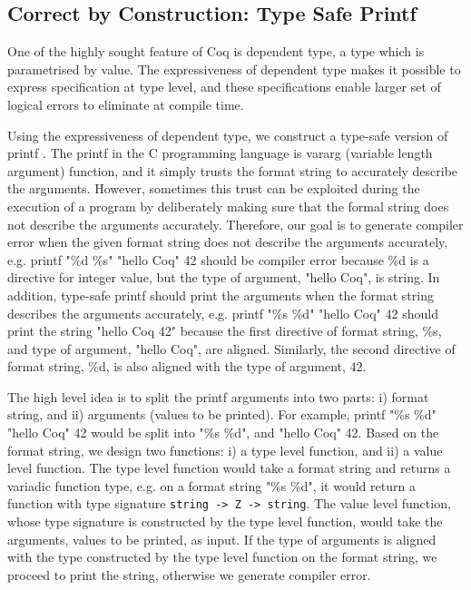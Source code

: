  \subsection{Correct by Construction: Type Safe Printf}
 \label{sec:deplambda}
  One of the highly sought feature of Coq is dependent type, 
  a type which is parametrised by value.  
  The expressiveness of dependent type makes it possible
  to express specification at type level,  and these specifications enable larger 
  set of  logical errors to eliminate at compile time. 
  
 
 Using the expressiveness of dependent type, we construct a type-safe version of 
 printf \citep{Pierce:2004:ATT:1076265}.  
The printf in the C programming language is vararg (variable length argument) function, 
and it simply trusts the format string to accurately describe the arguments.  However, 
sometimes this trust can be exploited during the execution of a program by deliberately 
making sure that  the formal string does not describe the arguments accurately.  Therefore,
 our goal is to generate compiler error when the given format string does not describe the 
 arguments accurately,  e.g. printf "\%d \%s" "hello Coq" 42 should be compiler error because
 \%d is a directive for integer value,  but the type of argument, "hello Coq", is string.  In addition, 
 type-safe printf should print the arguments when the format string describes the 
 arguments accurately, e.g.
 printf "\%s \%d" "hello Coq" 42 should print the string "hello Coq  42" because the first directive 
 of format string, \%s, and type of argument, "hello Coq", are aligned. Similarly, the second directive 
 of format string, \%d, is also aligned with the type of argument, 42. 
 
 The high level idea is to split the printf arguments into two parts: i) format string, 
 and ii) arguments (values to be printed). For example, printf "\%s \%d" "hello Coq" 42 would be split into "\%s \%d", and 
 "hello Coq" 42.  Based on the format string, we design two functions: i) a type level function, 
 and ii) a value level function. The type level function would 
 take a format string and returns a variadic function type, e.g. 
 on  a format string "\%s \%d", it would return a function with type 
 signature \texttt{string -> Z  -> string}.
 The value level function, whose type signature 
 is constructed by the type level function, would take the arguments, values to be printed, as input. If the 
 type of arguments is aligned with the type constructed by the type level function on the format string,
 we proceed to print the string, otherwise we generate compiler error.  
 


